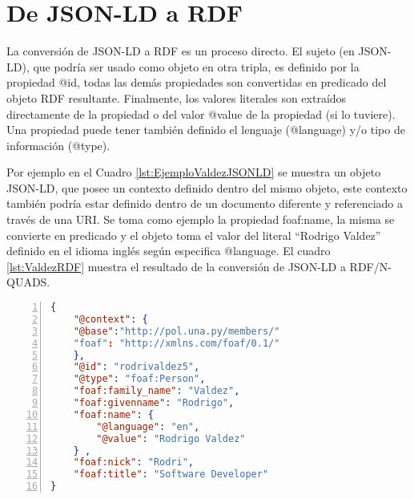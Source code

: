 \section{De JSON-LD a RDF}

La conversión de JSON-LD a RDF es un proceso directo. El sujeto (en JSON-LD), que podría ser usado como objeto en otra tripla, es definido por la propiedad @id, todas las demás propiedades son convertidas en predicado del objeto RDF resultante. Finalmente, los valores literales son extraídos directamente de la propiedad o del valor @value de la propiedad (si lo tuviere). Una propiedad puede tener también definido el lenguaje (@language) y/o tipo de información (@type).

Por ejemplo en el Cuadro \ref{lst:EjemploValdezJSONLD} se muestra un objeto JSON-LD, que posee un contexto definido dentro del mismo objeto, este contexto también podría estar definido dentro de un documento diferente y referenciado a través de una URI. Se toma como ejemplo la propiedad foaf:name, la misma se convierte en predicado y el objeto toma el valor del literal “Rodrigo Valdez” definido en el idioma inglés según especifica @language. El cuadro \ref{lst:ValdezRDF} muestra el resultado de la conversión de JSON-LD a RDF/N-QUADS.


\noindent\begin{minipage}{\textwidth}
    \begin{lstlisting}[captionpos=b, caption=Objeto JSON-LD. , label=lst:EjemploValdezJSONLD, language=json,firstnumber=1,  numbers=left,  numberstyle=\tiny\color{mygray},frame=single]
{
    "@context": {
	"@base":"http://pol.una.py/members/"
	"foaf": "http://xmlns.com/foaf/0.1/"
	},
	"@id": "rodrivaldez5",
	"@type": "foaf:Person",
	"foaf:family_name": "Valdez",
	"foaf:givenname": "Rodrigo",
	"foaf:name": {
		"@language": "en",
		"@value": "Rodrigo Valdez"
	} ,
	"foaf:nick": "Rodri",
	"foaf:title": "Software Developer"
}

        \end{lstlisting}
    \end{minipage}


